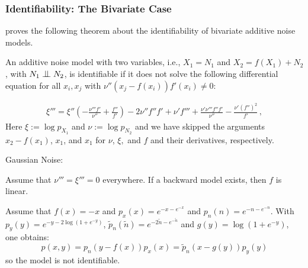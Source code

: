 \documentclass{beamer}
\newcommand{\bigCI}{\mathrel{\text{\scalebox{1.07}{$\perp\mkern-10mu\perp$}}}}
\begin{document}
\begin{frame}
\frametitle{Identifiability: The Bivariate Case}
 \cite{hoyer} proves the following theorem about the identifiability of  bivariate additive noise models.
\begin{theorem}
\begin{small}
An additive noise model with two variables, i.e., $X_1 = N_1$ and $X_2 = f(X_1) + N_2$, with $N_1 \bigCI N_2$, is identifiable if it does not solve the following differential equation for all $x_i,x_j$ with $\nu''(x_j-f(x_i))f'(x_i)\neq 0$:

\begin{equation*}
\begin{split}
\xi'''=   \xi''  \left(-\frac{\nu'''f'}{\nu''}
+\frac{f''}{f'}\right) 
-2 \nu''f''f' %
+\nu'f'''+\frac{\nu'\nu'''f''f'}{\nu''}-\frac{\nu'(f'')^2}{f'}\,,
\end{split}
\end{equation*}
Here $\xi:=\log p_{X_1}$ and $\nu:=\log p_{N_2}$ and we have skipped the arguments $x_2-f(x_1)$, $x_1$, and $x_1$  for $\nu$, $\xi,$ and $f$ and their derivatives, respectively.
\end{small}
\end{theorem}\end{frame}

\begin{frame}
\begin{corollary}{Gaussian Noise:}
\begin{small}
Assume that $\nu'''= \xi''' = 0$ everywhere. If a backward model exists, then $f$ is linear.
\end{small}
\end{corollary}
\begin{corollary}
\begin{small}
Assume that $f(x) = −x$ and $p_x(x) = e^{-x-e^{-x}}$ and $p_n(n) = e^{-n-e^{-n}}$.
With $p_y(y) = e^{-y-2 \log(1 + e^{−y})}$, $\tilde{p}_n(\tilde{n}) = e^{-2\tilde{n}-e^{-\tilde{n}}}$ and $g(y) = \log(1+e^{-y})$, one obtains:
$$p(x,y) =p_n(y-f(x))p_x(x) =\tilde{p}_n(x-g(y))p_y(y)$$
so the model is not identifiable.
\end{small}
\end{corollary}
\end{frame}
\end{document}
